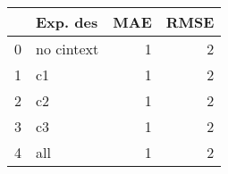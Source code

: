 \begin{tabular}{llrr}
\toprule
 & Exp. des & MAE & RMSE \\
\midrule
0 & no cintext & 1 & 2 \\
1 & c1 & 1 & 2 \\
2 & c2 & 1 & 2 \\
3 & c3 & 1 & 2 \\
4 & all & 1 & 2 \\
\bottomrule
\end{tabular}
